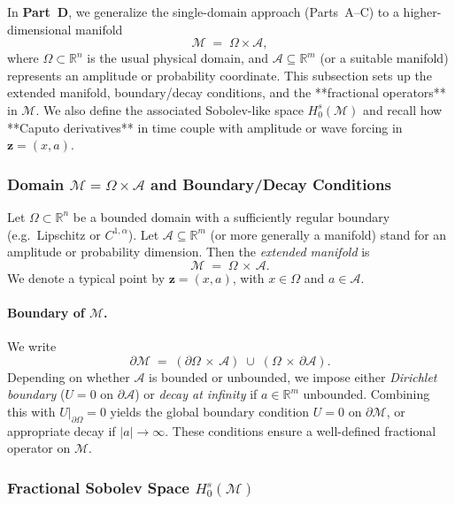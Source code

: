 \documentclass[12pt]{article}
\begin{document}
In \textbf{Part~D}, we generalize the single-domain approach (Parts~A--C) to a higher-dimensional 
manifold 
\[
\mathcal{M} \;=\; \Omega \times \mathcal{A},
\]
where \(\Omega\subset\mathbb{R}^n\) is the usual physical domain, and 
\(\mathcal{A}\subseteq\mathbb{R}^m\) (or a suitable manifold) represents an amplitude 
or probability coordinate. This subsection sets up the extended manifold, boundary/decay 
conditions, and the **fractional operators** in \(\mathcal{M}\). We also define the 
associated Sobolev-like space \(H_0^s(\mathcal{M})\) and recall how **Caputo derivatives** 
in time couple with amplitude or wave forcing in \(\mathbf{z}=(x,a)\).

\subsubsection{Domain \texorpdfstring{\(\mathcal{M} = \Omega\times \mathcal{A}\)}{} and Boundary/Decay Conditions}
\label{subsubsec:domain_M}

Let \(\Omega\subset\mathbb{R}^n\) be a bounded domain with a sufficiently regular boundary 
(e.g.\ Lipschitz or $C^{1,\alpha}$). Let \(\mathcal{A}\subseteq \mathbb{R}^m\) (or more 
generally a manifold) stand for an amplitude or probability dimension. Then the 
\emph{extended manifold} is
\[
\mathcal{M}
\;=\;
\Omega \,\times\, \mathcal{A}.
\]
We denote a typical point by \(\mathbf{z}=(x,a)\), with $x\in\Omega$ and $a\in\mathcal{A}$.

\paragraph{Boundary of \(\mathcal{M}\).}
We write
\[
\partial\mathcal{M}
\;=\;
(\partial\Omega \,\times\, \mathcal{A})
\;\cup\;
(\Omega \,\times\, \partial\mathcal{A}).
\]
Depending on whether $\mathcal{A}$ is bounded or unbounded, we impose either 
\emph{Dirichlet boundary} ($U=0$ on $\partial\mathcal{A}$) or \emph{decay at infinity} 
if $a\in\mathbb{R}^m$ unbounded. Combining this with $U|_{\partial \Omega}=0$ yields 
the global boundary condition $U=0$ on $\partial\mathcal{M}$, or appropriate decay if 
\(\lvert a\rvert\to \infty\). These conditions ensure a well-defined fractional operator 
on $\mathcal{M}$.

\subsubsection{Fractional Sobolev Space \texorpdfstring{$H_0^s(\mathcal{M})$}{}}
\label{subsubsec:H0sM}
\end{document}
